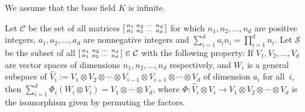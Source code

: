\documentclass[11pt]{article}
\theoremstyle{definition}
\theoremstyle{remark}
\begin{document}
\newcommand{\B}{{\mathcal B}}
\newcommand{\C}{{\mathbb C}}
\newcommand{\N}{{\mathbb N}}
\newcommand{\F}{{\mathbb F}}
\newcommand{\Q}{{\mathbb Q}}
\newcommand{\Z}{{\mathbb Z}}
\newcommand{\tnr}{\operatorname{Tr}}
\newcommand{\tnrace}{\operatorname{Tr}}
%
%
\newcommand{\SL}{\operatorname{SL}}
\newcommand{\Mod}{\operatorname{mod}}

\newcommand{\VV}{{\mathbb V}}

\newcommand{\nullcone}{\mathcal{N}}
%
%
\newcommand{\Sym}{S}

\newcommand{\rk} {\operatorname{rk}}
\newcommand{\g} {\mathfrak{g}}
\newcommand{\n} {\mathfrak{n}}
\newcommand{\h} {\mathfrak{h}}
\newcommand{\tn}{\mathfrak{t}}
\newcommand{\sln}{\mathfrak{sl}_n}
\newcommand{\adaptable} {adaptable}
\newcommand{\End}{{\rm End}}
\newcommand{\U}{\operatorname{U}}
\newcommand{\SU}{\operatorname{SU}}
\newcommand{\ad}{\rm ad}
\newcommand{\uncramped} {uncramped}
\newcommand{\Supp} {{\rm Supp}}
\newcommand{\wt}{\widetilde}
\newcommand{\isom} {\stackrel{\sim}{\longrightarrow}}
 \newcommand{\sslash}{\mathbin{\mkern-4mu/\mkern-6mu/\mkern-4mu}}
%
 \newcommand{\CC}{{\mathcal C}}
\newcommand{\SSS}{{\mathcal S}}


%
%
%




\newcommand{\comm}[1]{\textcolor{red}{$\clubsuit${\it #1}$\clubsuit$}}


%
%
%
%
%


%

We assume that the base field $K$ is infinite. 

Let $\CC$ be the set of all matrices $\begin{bsmallmatrix} n_1 & n_2 & \cdots & n_d\\a_1 & a_2  & \cdots & a_d\end{bsmallmatrix}$  for which  $n_1,n_2,\dots,n_d$ are positive integers, $a_1,a_2,\dots,a_d$ are nonnegative integers
and $\sum_{i=1}^d a_i n_i=\prod_{i=1}^d n_i$. Let $\SSS$ be the subset of all  $\begin{bsmallmatrix} n_1 & n_2 & \cdots & n_d\\a_1 & a_2  & \cdots & a_d\end{bsmallmatrix}\in {\CC}$ with the following property:
If $V_1,V_2,\dots,V_d$ are vector spaces of dimensions $n_1,n_2,\dots,n_d$ respectively, and $W_i$ is a general subspace
of $\widehat{V}_i:=V_1\otimes V_2\otimes \cdots \otimes V_{i-1}\otimes V_{i+1}\otimes \cdots\otimes V_d$ of dimension $a_i$ for all~$i$,
then $\sum_{i=1}^d \Phi_i( W_i\otimes V_i) = V_1 \otimes \cdots \otimes V_d$, where $\Phi:\widehat{V}_i\otimes V_i\to V_1\otimes V_2\otimes \cdots \otimes  V_d$ is
the isomorphism given by permuting the factors.
\end{document}
